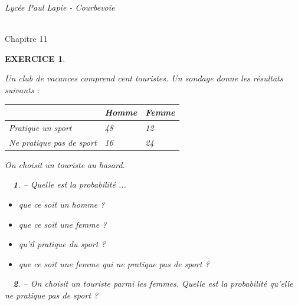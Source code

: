\documentclass[a4paper]{article}   %
\renewcommand{\(}{\left(}
\renewcommand{\)}{\right)}
\newtheorem{ques}{~}
\newenvironment{qu}{\begin{ques}--} {\end{ques}}
\newtheorem{EXO}{\large EXERCICE }
\newenvironment{EX}   { \setcounter{ques}{0} \begin{EXO} \hrulefill ~\vspace{0.3cm}

\normalfont}    {\end{EXO} \medskip}
\def\cl{{\Large \bf{2nde}}}
\begin{document}
\newpage \setcounter{EXO}{0}


\noindent\begin{minipage}{.20\linewidth}\begin{center}                  
\noindent \emph{Lycée Paul Lapie - Courbevoie}
\end{center}\end{minipage}
\begin{minipage}{1.5\linewidth}\begin{center}	
\noindent \cl\\ Chapitre 11
\end{center}\end{minipage}

\begin{center} 	
\end{center}
\begin{EX}
Un club de vacances comprend cent touristes. Un sondage donne les résultats suivants :
\begin{center}
\begin{tabular}{|p{4cm}| p{4cm}| p{4cm}|}		
\hline							
 & Homme & Femme \\
\hline
Pratique un sport & 48 & 12\\
\hline
Ne pratique pas de sport & 16 & 24\\
\hline
\end{tabular}
\end{center}
On choisit un touriste au hasard.
\begin{qu} Quelle est la probabilité ... \begin{itemize} \item que ce soit un homme ? \item que ce soit une femme ? \item qu'il pratique du sport ? \item que ce soit une femme qui ne pratique pas de sport ? \end{itemize}
\end{qu}
\begin{qu} On choisit un touriste parmi les femmes. Quelle est la probabilité qu'elle ne pratique pas de sport ?
\end{qu}
\end{EX}
\end{document}
